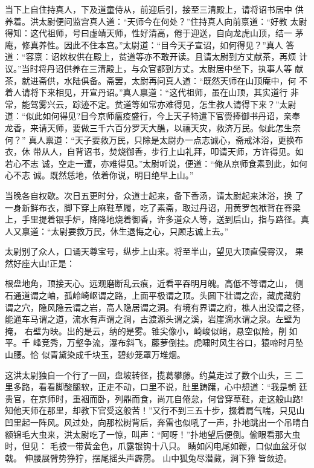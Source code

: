 当下上自住持真人，下及道童侍从，前迎后引，接至三清殿上，请将诏书居中
供养着。洪太尉便问监宫真人道：“天师今在何处？”住持真人向前禀道：“好教
太尉得知：这代祖师，号曰虚靖天师，性好清高，倦于迎送，自向龙虎山顶，结一
茅庵，修真养性。因此不住本宫。”太尉道：“目今天子宣诏，如何得见？”真人
答道：“容禀：诏敕权供在殿上，贫道等亦不敢开读。且请太尉到方丈献茶，再烦
计议。”当时将丹诏供养在三清殿上，与众官都到方丈。太尉居中坐下，执事人等
献茶，就进斋供，水陆俱备。斋罢，太尉再问真人道：“既然天师在山顶庵中，何
不着人请将下来相见，开宣丹诏。”真人禀道：“这代祖师，虽在山顶，其实道行
非常，能驾雾兴云，踪迹不定。贫道等如常亦难得见，怎生教人请得下来？”太尉
道：“似此如何得见?目今京师瘟疫盛行，今上天子特遣下官赍捧御书丹诏，亲奉
龙香，来请天师，要做三千六百分罗天大醮，以禳天灾，救济万民。似此怎生奈何？”
真人禀道：“天子要救万民，只除是太尉办一点志诚心，斋戒沐浴，更换布衣，休
带从人，自背诏书，焚烧御香，步行上山礼拜，叩请天师，方许得见。如若心不志
诚，空走一遭，亦难得见。”太尉听说，便道：“俺从京师食素到此，如何心不志
诚。既然恁地，依着你说，明日绝早上山。”

当晚各自权歇。次日五更时分，众道士起来，备下香汤，请太尉起来沐浴，换
了一身新鲜布衣，脚下穿上麻鞋草履，吃了素斋，取过丹诏，用黄罗包袱背在脊梁
上，手里提着银手炉，降降地烧着御香，许多道众人等，送到后山，指与路径。真
人又禀道：“太尉要救万民，休生退悔之心，只顾志诚上去。”

太尉别了众人，口诵天尊宝号，纵步上山来。将至半山，望见大顶直侵霄汉，
果然好座大山!正是：

根盘地角，顶接天心。远观磨断乱云痕，近看平吞明月魄。高低不等谓之山，
侧石通道谓之岫，孤岭崎岖谓之路，上面平极谓之顶。头圆下壮谓之峦，藏虎藏豹
谓之穴，隐风隐云谓之岩，高人隐居谓之洞。有境有界谓之府，樵人出没谓之径，
能通车马谓之道，流水有声谓之涧，古渡源头谓之溪，岩崖滴水谓之泉。左壁为掩，
右壁为映。出的是云，纳的是雾。锥尖像小，崎峻似峭，悬空似险，削如平。千
峰竞秀，万壑争流，瀑布斜飞，藤萝倒挂。虎啸时风生谷口，猿啼时月坠山腰。恰
似青黛染成千块玉，碧纱笼罩万堆烟。

这洪太尉独自一个行了一回，盘坡转径，揽葛攀藤。约莫走过了数个山头，三
二里多路，看看脚酸腿软，正走不动，口里不说，肚里踌躇，心中想道：“我是朝
廷贵官，在京师时，重裀而卧，列鼎而食，尚兀自倦怠，何曾穿草鞋，走这般山路!
知他天师在那里，却教下官受这般苦！”又行不到三五十步，掇着肩气喘，只见山
凹里起一阵风。风过处，向那松树背后，奔雷也似吼了一声，扑地跳出一个吊睛白
额锦毛大虫来，洪太尉吃了一惊，叫声：“阿呀！”扑地望后便倒。偷眼看那大虫
时，但见：
毛披一带黄金色，爪露银钩十八只。
睛如闪电尾如鞭，口似血盆牙似戟。
伸腰展臂势狰狞，摆尾摇头声霹雳。
山中狐兔尽潜藏，涧下獐皆敛迹。

